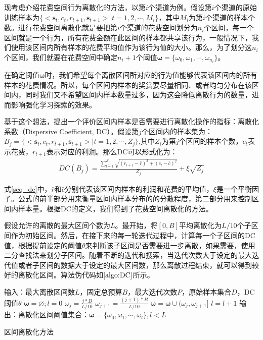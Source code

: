 现考虑介绍花费空间行为离散化的方法，以第$i$个渠道为例。假设第$i$个渠道的原始训练样本为$\{<\mathbf{s}_{t},c_{t},r_{t+1},\mathbf{s}_{t+1}>|t=1,2,\cdots,M_{i}\}$，其中$M_{i}$为第$i$个渠道的样本个数。进行花费空间离散化就是要把第$i$个渠道的花费空间划分为$n_{i}$个区间，每一个区间就是一个行为，所有花费金额在此区间的样本都共享该行为，一般情况下，我们使用该区间内所有样本的花费平均值作为该行为值的大小。那么，为了划分这$n_{i}$个区间，我们就要在花费空间中确定$n_{i}+1$个阈值$\bm{\omega}=\{\omega_{0},\omega_{1},\cdots,\omega_{n_{i}}\}$。

在确定阈值$\bm{\omega}$时，我们希望每个离散区间所对应的行为值能够代表该区间内的所有样本的花费情况。所以，每个区间内样本的奖赏要尽量相同、或者均匀分布在该区间内，同时我们又不希望区间内样本数量过多，因为这会降低离散行为的数量，进而影响强化学习探索的效果。

基于这个想法，提出一个评价区间内样本是否需要进行离散化操作的指标：离散化系数（Dispersive Coefficient, DC）。假设第$j$个区间内的样本集为：$B_{j}=\{<\mathbf{s}_{t},c_{t},r_{t+1},\mathbf{s}_{t+1}>|t=1,2,\cdots,Z_{j}\}$,其中$Z_{i}$为第$j$个区间的样本个数，$c_{t}$表示花费，$r_{t+1}$表示对应的利润。那么DC可以形式化为：
\begin{equation}\label{seq_dc}
\begin{aligned}
DC(B_{j})=\frac{\sum_{l=1}^{Z_{j}}\sqrt{(r_{l+1}-\bar{r})^2+(c_{l}-\bar{c})^2}}{Z_{j}}+\xi \sqrt{Z_{j}}
\end{aligned}
\end{equation}

式\eqref{seq_dc}中，$\bar{r}$和$\bar{c}$分别代表该区间内样本的利润和花费的平均值，$\xi$是一个平衡因子。公式的前半部分用来衡量区间内样本分布的的分散程度，第二部分用来控制区间内样本量。根据DC的定义，我们得到了花费空间离散化的方法。

假设允许的离散的最大区间个数为$L$。最开始，将$[0,B]$平均离散化为$L/10$个子区间作为初始区间。然后，在接下来的每一轮迭代过程中，计算每一个子区间的DC值，根据提前设定的阈值$\theta$来判断该子区间是否需要进一步离散，如果需要，使用二分查找法来划分子区间。随着不断的迭代和搜索，当迭代次数大于设定的最大迭代值或者子区间的数据大于设定的最大区间数，那么离散过程结束，就可以得到较好的离散化区间。算法伪代码如$\ref{algo:DC}$所示。
\begin{algorithm}[htbp]
\small
\SetAlgoLined
{} 
输入：最大离散区间数$L$，固定总预算$B$，最大迭代次数$P$，原始样本集合$D$，DC阈值$\theta$\;
$\bm{\omega}=\varnothing; l=0$\;
	{$\omega_{j}=\frac{j*B}{L/10}$\;
	$\omega_{j+1}=\frac{(j+1)*B}{L/10}$\;
	$\bm{\omega}=\bm{\omega} \cup (\omega_{j},\omega_{j+1}]$\;
	$l=l+1$\;
	}
\While{$l<L$ 且 $p<P$}{
	\For{$all interval (\omega_{j},\omega_{j+1}] \in \bm{\omega}$}{
		$dc=DC(B_{j})$，其中$B_{j}$为第$j$个区间的样本集合\;
		\If{$dc>\theta$}{
			$\omega^{'}=\frac{\omega_{j}+\omega_{j+1}}{2}$\;
			$\bm{\omega}=\bm{\omega} \backslash (\omega_{j},\omega_{j+1}]$\;
			$\bm{\omega}=\bm{\omega} \cup (\omega_{j},\omega^{'}]$\;
			$\bm{\omega}=\bm{\omega} \cup (\omega_{'},\omega^{j+1}]$\;
			$l=l+1$\;
		}
	}
	$p=p+1$\;
}
输出：离散化区间阈值集合：$\bm{\omega}=\{\omega_{0},\omega_{1},\cdots,\omega_{l}\}, l<L$\;
\caption{区间离散化方法}
\label{algo:DC}
\end{algorithm}

